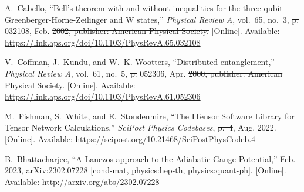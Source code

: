 \documentclass[a4paper,oneside,11pt]{book}
\providecommand{\DIFaddtex}[1]{{\protect\color{blue}\uwave{#1}}} %
\providecommand{\DIFdeltex}[1]{{\protect\color{red}\sout{#1}}}                      %
\providecommand{\DIFaddbegin}{} %
\providecommand{\DIFaddend}{} %
\providecommand{\DIFdelbegin}{} %
\providecommand{\DIFdelend}{} %
\providecommand{\DIFadd}[1]{\texorpdfstring{\DIFaddtex{#1}}{#1}} %
\providecommand{\DIFdel}[1]{\texorpdfstring{\DIFdeltex{#1}}{}} %
\newcommand{\DIFscaledelfig}{0.5}
\newlength{\DIFdelgraphicswidth} %
\newlength{\DIFdelgraphicsheight} %
\newcommand{\DIFaddincludegraphics}[2][]{{\color{blue}\fbox{\DIFOincludegraphics[#1]{#2}}}} %
\newcommand{\DIFdelincludegraphics}[2][]{%
\sbox{\DIFdelgraphicsbox}{\DIFOincludegraphics[#1]{#2}}%
\settoboxwidth{\DIFdelgraphicswidth}{\DIFdelgraphicsbox} %
\settoboxtotalheight{\DIFdelgraphicsheight}{\DIFdelgraphicsbox} %
\scalebox{\DIFscaledelfig}{%
\parbox[b]{\DIFdelgraphicswidth}{\usebox{\DIFdelgraphicsbox}\\[-\baselineskip] \rule{\DIFdelgraphicswidth}{0em}}\llap{\resizebox{\DIFdelgraphicswidth}{\DIFdelgraphicsheight}{%
\setlength{\unitlength}{\DIFdelgraphicswidth}%
\begin{picture}(1,1)%
\thicklines\linethickness{2pt} %
{\color[rgb]{1,0,0}\put(0,0){\framebox(1,1){}}}%
{\color[rgb]{1,0,0}\put(0,0){\line( 1,1){1}}}%
{\color[rgb]{1,0,0}\put(0,1){\line(1,-1){1}}}%
\end{picture}%
}\hspace*{3pt}}} %
} %
\DeclareRobustCommand{\DIFaddbegin}{\DIFOaddbegin \let\includegraphics\DIFaddincludegraphics} %
\DeclareRobustCommand{\DIFaddend}{\DIFOaddend \let\includegraphics\DIFOincludegraphics} %
\DeclareRobustCommand{\DIFdelbegin}{\DIFOdelbegin \let\includegraphics\DIFdelincludegraphics} %
\DeclareRobustCommand{\DIFdelend}{\DIFOaddend \let\includegraphics\DIFOincludegraphics} %
\begin{document}
\begin{thebibliography}{100}
\BIBentryALTinterwordspacing
A.~Cabello, ``Bell's theorem with and without inequalities for the three-qubit
  {Greenberger}-{Horne}-{Zeilinger} and {W} states,'' \emph{Physical Review A},
  vol.~65, no.~3,  \DIFdelbegin \DIFdel{p. }\DIFdelend 032108, Feb. \DIFdelbegin \DIFdel{2002, publisher: American Physical Society.
  }\DIFdelend \DIFaddbegin \DIFadd{2002. }\DIFaddend [Online]. Available:
  \url{https://link.aps.org/doi/10.1103/PhysRevA.65.032108}
\BIBentrySTDinterwordspacing

\BIBentryALTinterwordspacing
V.~Coffman, J.~Kundu, and W.~K. Wootters, ``Distributed entanglement,''
  \emph{Physical Review A}, vol.~61, no.~5,  \DIFdelbegin \DIFdel{p. }\DIFdelend 052306, Apr. \DIFdelbegin \DIFdel{2000, publisher:
  American Physical Society. }\DIFdelend \DIFaddbegin \DIFadd{2000. }\DIFaddend [Online].
  Available: \url{https://link.aps.org/doi/10.1103/PhysRevA.61.052306}
\BIBentrySTDinterwordspacing

\BIBentryALTinterwordspacing
M.~Fishman, S.~White, and E.~Stoudenmire, ``The {ITensor} {Software} {Library}
  for {Tensor} {Network} {Calculations},'' \emph{SciPost Physics Codebases},
  \DIFdelbegin \DIFdel{p.~4}\DIFdelend \DIFaddbegin \DIFadd{4--r0.3}\DIFaddend , Aug. 2022. [Online]. Available:
  \url{https://scipost.org/10.21468/SciPostPhysCodeb.4}
\BIBentrySTDinterwordspacing

\BIBentryALTinterwordspacing
B.~Bhattacharjee, ``A {Lanczos} approach to the {Adiabatic} {Gauge}
  {Potential},'' Feb. 2023, arXiv:2302.07228 [cond-mat, physics:hep-th,
  physics:quant-ph]. [Online]. Available: \url{http://arxiv.org/abs/2302.07228}
\BIBentrySTDinterwordspacing

\end{thebibliography}
\end{document}
